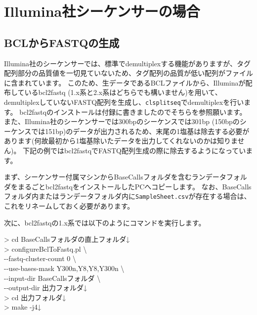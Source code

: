 \documentclass[titlepage,10pt,a4paper]{jsbook}
\newenvironment{cmd}{\begin{oframed}\raggedright\ttfamily\footnotesize\setlength{\baselineskip}{1.4em}}{\end{oframed}\vspace{-1em}}
\begin{document}
\section{Illumina社シーケンサーの場合}

\subsection{BCLからFASTQの生成}

Illumina社のシーケンサーでは、標準でdemultiplexする機能がありますが、タグ配列部分の品質値を一切見ていないため、タグ配列の品質が低い配列がファイルに含まれています。
このため、生データであるBCLファイルから、Illuminaが配布しているbcl2fastq (1.x系と2.x系はどちらでも構いません)を用いて、demultiplexしていないFASTQ配列を生成し、\texttt{clsplitseq}でdemultiplexを行います。
bcl2fastqのインストールは付録に書きましたのでそちらを参照願います。
また、Illumina社のシーケンサーでは300bpのシーケンスでは301bp (150bpのシーケンスでは151bp)のデータが出力されるため、末尾の1塩基は除去する必要があります(何故最初から1塩基除いたデータを出力してくれないのかは知りません)。
下記の例ではbcl2fastqでFASTQ配列生成の際に除去するようになっています。

まず、シーケンサー付属マシンからBaseCallsフォルダを含むランデータフォルダをまるごとbcl2fastqをインストールしたPCへコピーします。
なお、BaseCallsフォルダ内またはランデータフォルダ内に\texttt{SampleSheet.csv}が存在する場合は、これをリネームしておく必要があります。

次に、bcl2fastqの1.x系では以下のようにコマンドを実行します。

\begin{cmd}
{\textgreater} cd BaseCallsフォルダの直上フォルダ↓\\
{\textgreater} configureBclToFastq.pl {\textbackslash}\\
{-}{-}fastq-cluster-count 0 {\textbackslash}\\
{-}{-}use-bases-mask Y300n,Y8,Y8,Y300n {\textbackslash}\\
{-}{-}input-dir BaseCallsフォルダ {\textbackslash}\\
{-}{-}output-dir 出力フォルダ↓\\
{\textgreater} cd 出力フォルダ↓\\
{\textgreater} make -j4↓
\end{cmd}
\end{document}
